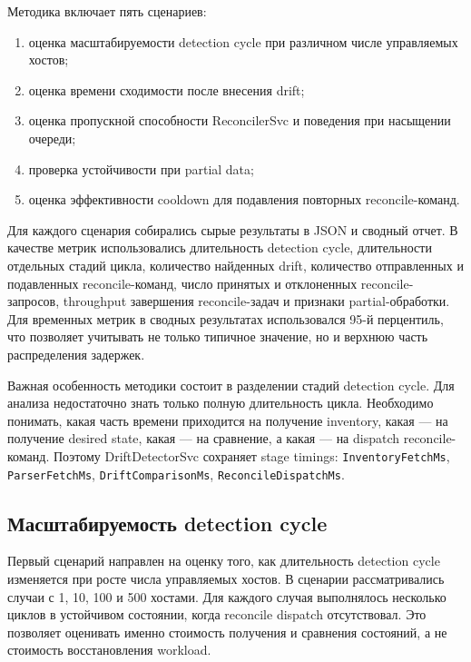 Методика включает пять сценариев:
\begin{enumerate}
    \item оценка масштабируемости detection cycle при различном числе управляемых хостов;
    \item оценка времени сходимости после внесения drift;
    \item оценка пропускной способности ReconcilerSvc и поведения при насыщении очереди;
    \item проверка устойчивости при partial data;
    \item оценка эффективности cooldown для подавления повторных reconcile-команд.
\end{enumerate}

Для каждого сценария собирались сырые результаты в JSON и сводный отчет. В качестве метрик использовались длительность detection cycle, длительности отдельных стадий цикла, количество найденных drift, количество отправленных и подавленных reconcile-команд, число принятых и отклоненных reconcile-запросов, throughput завершения reconcile-задач и признаки partial-обработки. Для временных метрик в сводных результатах использовался 95-й перцентиль, что позволяет учитывать не только типичное значение, но и верхнюю часть распределения задержек.

Важная особенность методики состоит в разделении стадий detection cycle. Для анализа недостаточно знать только полную длительность цикла. Необходимо понимать, какая часть времени приходится на получение inventory, какая --- на получение desired state, какая --- на сравнение, а какая --- на dispatch reconcile-команд. Поэтому DriftDetectorSvc сохраняет stage timings: \texttt{InventoryFetchMs}, \texttt{ParserFetchMs}, \texttt{DriftComparisonMs}, \texttt{ReconcileDispatchMs}.

\subsection{Масштабируемость detection cycle}

Первый сценарий направлен на оценку того, как длительность detection cycle изменяется при росте числа управляемых хостов. В сценарии рассматривались случаи с 1, 10, 100 и 500 хостами. Для каждого случая выполнялось несколько циклов в устойчивом состоянии, когда reconcile dispatch отсутствовал. Это позволяет оценивать именно стоимость получения и сравнения состояний, а не стоимость восстановления workload.


